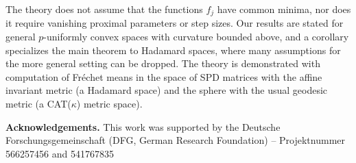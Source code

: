 \documentclass[11pt]{article}
\begin{document}
The theory does not assume that the functions $f_j$ have common minima, nor does it require vanishing proximal parameters or step sizes.
Our results are stated for general $p$-uniformly convex
spaces with curvature bounded above, and a corollary specializes the main theorem
to Hadamard spaces, where many assumptions for the more general setting can be dropped.
The theory is demonstrated with computation of Fr\'echet means in the
space of SPD matrices with the affine invariant metric (a Hadamard space) and the
sphere with the usual geodesic metric (a CAT($\kappa$) metric space).

\vspace{1em}

\noindent
\textbf{Acknowledgements.}
This work was supported by the Deutsche Forschungsgemeinschaft (DFG, German Research Foundation) – Projektnummer 566257456 and 541767835

\vspace{1em}
\end{document}
